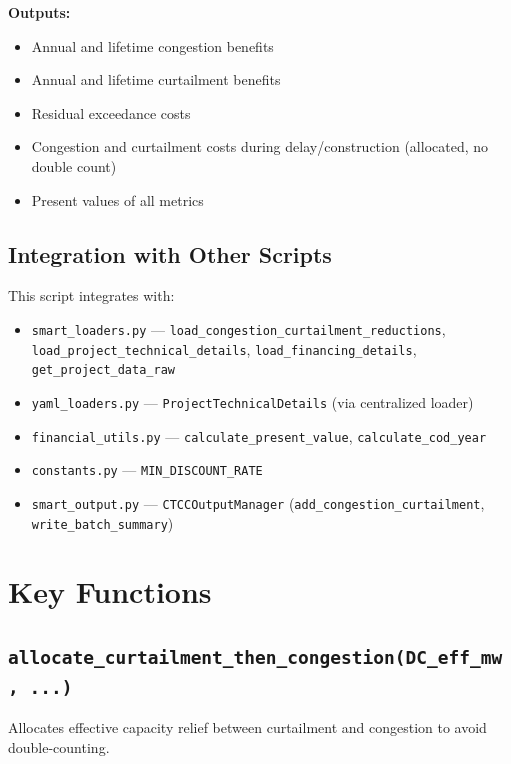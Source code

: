 \documentclass[ctcc_full_documentation.tex]{subfiles}
\begin{document}
\textbf{Outputs:}
\begin{itemize}
    \item Annual and lifetime congestion benefits
    \item Annual and lifetime curtailment benefits
    \item Residual exceedance costs
    \item Congestion and curtailment costs during delay/construction (allocated, no double count)
    \item Present values of all metrics
\end{itemize}

\subsection{Integration with Other Scripts}

This script integrates with:
\begin{itemize}
    \item \texttt{smart\_loaders.py} --- \texttt{load\_congestion\_curtailment\_reductions}, \texttt{load\_project\_technical\_details}, \texttt{load\_financing\_details}, \texttt{get\_project\_data\_raw}
    \item \texttt{yaml\_loaders.py} --- \texttt{ProjectTechnicalDetails} (via centralized loader)
    \item \texttt{financial\_utils.py} --- \texttt{calculate\_present\_value}, \texttt{calculate\_cod\_year}
    \item \texttt{constants.py} --- \texttt{MIN\_DISCOUNT\_RATE}
    \item \texttt{smart\_output.py} --- \texttt{CTCCOutputManager} (\texttt{add\_congestion\_curtailment}, \texttt{write\_batch\_summary})
\end{itemize}

\section{Key Functions}

\subsection{\texttt{allocate\_curtailment\_then\_congestion(DC\_eff\_mw, ...)}}

Allocates effective capacity relief between curtailment and congestion to avoid double-counting.
\end{document}
